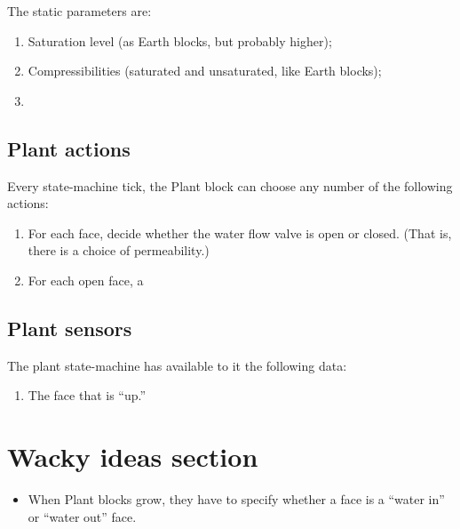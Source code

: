 \documentclass[10pt, a4paper, twocolumn]{article}
\begin{document}
The static parameters are:
\begin{enumerate}
\item Saturation level (as Earth blocks, but probably higher);
\item Compressibilities (saturated and unsaturated, like Earth
  blocks);
\item \ellipses
\end{enumerate}

\subsection{Plant actions}

Every state-machine tick, the Plant block can choose any number of the
following actions:

\begin{enumerate}
\item For each face, decide whether the water flow valve is open or
  closed. (That is, there is a choice of permeability.)
\item For each open face, a 
\end{enumerate}

\subsection{Plant sensors}

The plant state-machine has available to it the following data:
\begin{enumerate}
\item The face that is ``up.'' 
\end{enumerate}


\section{Wacky ideas section}

\begin{itemize}
\item When Plant blocks grow, they have to specify whether a face is a
  ``water in'' or ``water out'' face. 
\end{itemize}
\end{document}
